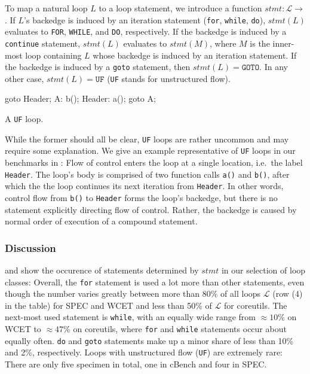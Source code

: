     To map a natural loop $L$ to a loop statement, we introduce a function $stmt: \mathcal{L} \rightarrow$ . If $L$'s backedge is induced by an iteration statement (\texttt{for}, \texttt{while}, \texttt{do}), $stmt(L)$ evaluates to \texttt{FOR}, \texttt{WHILE}, and \texttt{DO}, respectively. If the backedge is induced by a \texttt{continue} statement, $stmt(L)$ evaluates to $stmt(M)$, where $M$ is the inner-most loop containing $L$ whose backedge is induced by an iteration statement. If the backedge is induced by a \texttt{goto} statement, then $stmt(L) = \texttt{GOTO}$. In any other case, $stmt(L) = \texttt{UF}$ (\texttt{UF} stands for unstructured flow).

\begin{listing}
\begin{ccode}
  goto Header;
A:
  b();
Header:
  a();
  goto A;
\end{ccode}
\caption{A \texttt{UF} loop.}
\label{lst:unstr}
\end{listing}

While the former should all be clear, \texttt{UF} loops are rather uncommon and may require some explanation. We give an example representative of \texttt{UF} loops in our benchmarks in : Flow of control enters the loop at a single location, i.e.\ the label \texttt{Header}. The loop's body is comprised of two function calls \texttt{a()} and \texttt{b()}, after which the the loop continues its next iteration from \texttt{Header}. In other words, control flow from \texttt{b()} to \texttt{Header} forms the loop's backedge, but there is no statement explicitly directing flow of control. Rather, the backedge is caused by normal order of execution of a compound statement.

\subsubsection{Discussion}

 and  show the occurence of statements determined by $stmt$ in our selection of loop classes: Overall, the \texttt{for} statement is used a lot more than other statements, even though the number varies greatly between more than 80\% of all loops $\mathcal{L}$ (row (4) in the table) for SPEC and WCET and less than 50\% of $\mathcal{L}$ for coreutils. The next-most used statement is \texttt{while}, with an equally wide range from $\approx 10\%$ on WCET to $\approx 47\%$ on coreutils, where \texttt{for} and \texttt{while} statements occur about equally often. \texttt{do} and \texttt{goto} statements make up a minor share of less than 10\% and 2\%, respectively. Loops with unstructured flow (\texttt{UF}) are extremely rare: There are only five specimen in total, one in cBench and four in SPEC.

